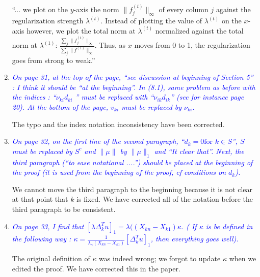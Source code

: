 \documentclass[pdftex,12pt]{article}
\def\rc#1{{\it\textcolor{blue}{#1}}\smallskip}
\begin{document}
\begin{enumerate}
``... we plot on the $y$-axis the norm $\|f^{(t)}_j\|_{\infty}$ of every
column $j$ against the regularization strength
$\lambda^{(t)}$. Instead of plotting the value of $\lambda^{(t)}$ on
the $x$-axis however, we plot the total norm at $\lambda^{(t)}$
normalized against the total norm at $\lambda^{(1)}$: $\frac{\sum_j
  \|f^{(t)}_j\|_{\infty}}{\sum_j \|f^{(1)}\|_{\infty}}$. Thus, as
$x$ moves from 0 to 1, the regularization goes from strong to
weak.''

\item \rc{On page 31, at the top of the page, ``see discussion at beginning of
Section 5'' : I think it should be ``at the beginning''. In (8.1),
same problem as before with the indices : ``$\nu_{ki} d_{ki}$ '' must be replaced
with ``$\nu_{ik}d_{ik}$'' (see for instance page 20). At the bottom of the page,
$v_{ki}$ must be replaced by $\nu_{ki}$.} 

The typo and the index notation inconsistency have been corrected.

\item \rc{On page 32, on the first line of the second paragraph, ``$d_k = 0 \mbox{for $k
\in S$}$'', $S$ must be replaced by $S^c$ and $\|\mu\|$ by $\|\mu\|_1$ and ``It clear
that''. Next, the third paragraph (``to ease notational ....'') should
be placed at the beginning of the proof (it is used from the beginning
of the proof, cf conditions on $d_k$).}

We cannot move the third paragraph to the beginning because it is not
clear at that point that $k$ is fixed. We have corrected all of the
notation before the third paragraph to be
consistent.

\item \rc{On page 33, I find that $[\lambda\Delta_k^Tu]_1 = \lambda((X_{kn} −X_{k1})\kappa$. ( If $\kappa$ is be defined
in the following way : $\kappa = \frac{1}{\lambda_n(X_{kn}-X_{k1})}[\Delta_k^T u]_1$, then everything
goes well).}

The original definition of $\kappa$ was indeed wrong; we forgot to update $\kappa$ when we edited the proof. We have corrected this in the paper.




\end{enumerate}
\end{document}
